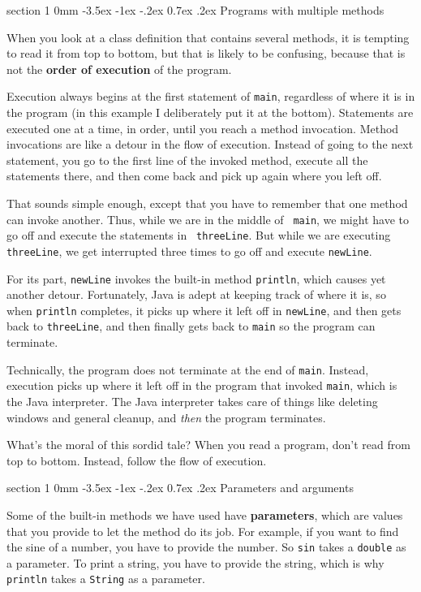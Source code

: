 \documentclass{book}
\makeatletter
\renewcommand{\section}{\@startsection 
    {section} {1} {0mm}%
    {-3.5ex \@plus -1ex \@minus -.2ex}%
    {0.7ex \@plus.2ex}%
    {\normalfont\Large\bfseries}}
\makeatother
\begin{document}
\section {Programs with multiple methods}

When you look at a class definition that contains several methods, it
is tempting to read it from top to bottom, but that is likely to be
confusing, because that is not the {\bf order of execution} of the
program.

Execution always begins at the first statement of {\tt main},
regardless of where it is in the program (in this example I deliberately
put it at the bottom).  Statements are executed one at a time, in
order, until you reach a method invocation.  Method invocations are
like a detour in the flow of execution.  Instead of going to the next
statement, you go to the first line of the invoked method, execute all
the statements there, and then come back and pick up again where you
left off.

That sounds simple enough, except that you have to remember that one
method can invoke another.  Thus, while we are in the middle of {\tt
main}, we might have to go off and execute the statements in {\tt
threeLine}.  But while we are executing {\tt threeLine}, we get
interrupted three times to go off and execute {\tt newLine}.

For its part, {\tt newLine} invokes the built-in method
{\tt println}, which causes yet another detour.  Fortunately,
Java is adept at keeping track of where it is, so when
{\tt println} completes, it picks up where it left off in
{\tt newLine}, and then gets back to {\tt threeLine}, and then
finally gets back to {\tt main} so the program can terminate.

Technically, the program does not terminate at the
end of {\tt main}.  Instead, execution picks up where it left
off in the program that invoked {\tt main}, which is the
Java interpreter.  The Java interpreter takes care of things
like deleting windows and general cleanup, and {\em then}
the program terminates.

What's the moral of this sordid tale?  When you
read a program, don't read from top to bottom.  Instead,
follow the flow of execution.


\section {Parameters and arguments}

Some of the built-in methods we have used have {\bf parameters},
which are values that you provide to let the method do its
job.  For example, if you want to find the sine of a number,
you have to provide the number.  So {\tt sin}
takes a {\tt double} as a parameter.  To print a string,
you have to provide the string, which is why {\tt println}
takes a {\tt String} as a parameter.
\end{document}

